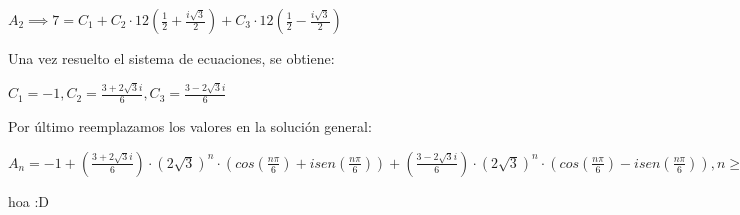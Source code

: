 \begin{solution}
\begin{center}
      $A_2 \implies 7 = C_1 + C_2\cdot12(\frac{1}{2} + \frac{i\sqrt{3}}{2}) + C_3\cdot12(\frac{1}{2} - \frac{i\sqrt{3}}{2})$
  \end{center}
  
  Una vez resuelto el sistema de ecuaciones, se obtiene:
  \begin{center}
      $C_1 = -1, C_2 = \frac{3+2\sqrt{3}i}{6}, C_3 = \frac{3-2\sqrt{3}i}{6}$
  \end{center}
  
  Por último reemplazamos los valores en la solución general:
  \begin{center}
      $A_n = -1 + (\frac{3+2\sqrt{3}i}{6})\cdot(2\sqrt{3})^n\cdot(cos(\frac{n\pi}{6})+isen(\frac{n\pi}{6}))+(\frac{3-2\sqrt{3}i}{6})\cdot(2\sqrt{3})^n\cdot(cos(\frac{n\pi}{6})-isen(\frac{n\pi}{6})), n \geq 0$
  \end{center}
  hoa :D
\end{solution}